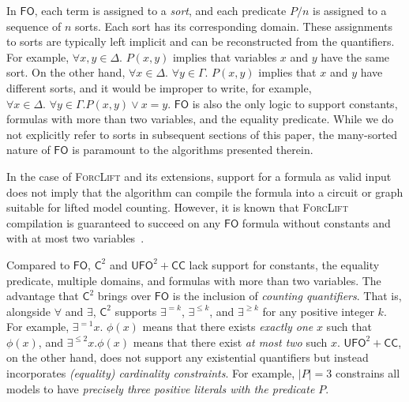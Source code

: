 \documentclass[a4paper,UKenglish,cleveref, autoref, thm-restate]{lipics-v2021}
\newcommand{\Ctwo}{$\mathsf{C}^{2}$}
\newcommand{\FO}{$\mathsf{FO}$}
\newcommand{\UFO}{$\mathsf{UFO}^{2} + \mathsf{CC}$}
\begin{document}
\renewcommand*{\thefootnote}{\arabic{footnote}}

In \FO{}, each term is assigned to a \emph{sort}, and each predicate $P/n$ is
assigned to a sequence of $n$ sorts. Each sort has its corresponding domain.
These assignments to sorts are typically left implicit and can be reconstructed
from the quantifiers. For example, $\forall x,y \in \Delta\text{. }P(x, y)$
implies that variables $x$ and $y$ have the same sort. On the other hand,
$\forall x \in \Delta\text{. }\forall y \in \Gamma\text{. } P(x, y)$ implies
that $x$ and $y$ have different sorts, and it would be improper to write, for
example, $\forall x \in \Delta\text{. }\forall y \in \Gamma\text{.
} P(x, y) \lor x = y$. \FO{} is also the only logic to support constants,
formulas with more than two variables, and the equality predicate. While we do
not explicitly refer to sorts in subsequent sections of this paper, the
many-sorted nature of \FO{} is paramount to the algorithms presented therein.

\begin{remark}
  In the case of \textsc{ForcLift} and its extensions, support for a formula as
  valid input does not imply that the algorithm can compile the formula into a
  circuit or graph suitable for lifted model counting. However, it is known that
  \textsc{ForcLift} compilation is guaranteed to succeed on any \FO{} formula
  without constants and with at most two
  variables~\cite{DBLP:conf/nips/Broeck11,DBLP:conf/kr/BroeckMD14}.
\end{remark}

Compared to \FO{}, \Ctwo{} and \UFO{} lack support for constants, the equality
predicate, multiple domains, and formulas with more than two variables. The
advantage that \Ctwo{} brings over \FO{} is the inclusion of \emph{counting
  quantifiers}. That is, alongside $\forall$ and $\exists$, \Ctwo{} supports
$\exists^{=k}$, $\exists^{\le k}$, and $\exists^{\ge k}$ for any positive
integer $k$. For example, $\exists^{=1} x\text{. }\phi(x)$ means that there
exists \emph{exactly one} $x$ such that $\phi(x)$, and $\exists^{\le 2} x\text{.
}\phi(x)$ means that there exist \emph{at most two} such $x$. \UFO{}, on the
other hand, does not support any existential quantifiers but instead
incorporates \emph{(equality) cardinality constraints}. For example, $|P| = 3$
constrains all models to have \emph{precisely three positive literals with the
  predicate $P$}.
\end{document}
